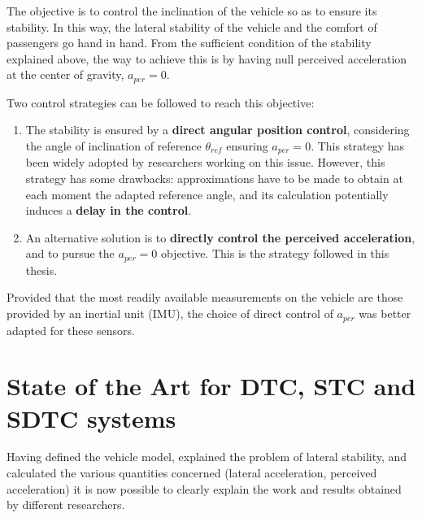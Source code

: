 The objective is to control the inclination of the vehicle so as to ensure its stability. In this way, the lateral stability of the vehicle and the comfort of passengers go hand in hand. From the sufficient condition of the stability explained above, the way to achieve this is by having null perceived acceleration at the center of gravity, $a_{per}=0$.

Two control strategies can be followed to reach this objective:

\begin{enumerate}
\item The stability is ensured by a \textbf{direct angular position control}, considering the angle of inclination of reference $\theta_{ref}$ ensuring $a_{per}=0$. This strategy has been widely adopted by researchers working on this issue. However, this strategy has some drawbacks: approximations have to be made to obtain at each moment the adapted reference angle, and its calculation potentially induces a \textbf{delay in the control}. 

\item An alternative solution is to \textbf{directly control the perceived acceleration}, and to pursue the $a_{per}=0$ objective. This is the strategy followed in this thesis. 
\end{enumerate}

Provided that the most readily available measurements on the vehicle are those provided by an inertial unit (IMU), the choice of direct control of $a_{per}$ was better adapted for these sensors.

\section{State of the Art for DTC, STC and SDTC systems}
Having defined the vehicle model, explained the problem of lateral stability, and calculated the various quantities concerned (lateral acceleration, perceived acceleration) it is now possible to clearly explain the work and results obtained by different researchers.

